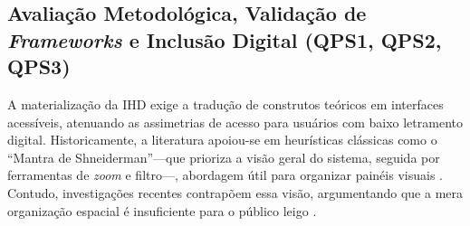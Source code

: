 \documentclass[12pt]{article}
\newcommand{\hlcite}[1]{\colorbox{yellow}{\cite{#1}}} %
\begin{document}
{{    %


    \subsection{Avaliação Metodológica, Validação de \textit{Frameworks} e Inclusão Digital (QPS1, QPS2, QPS3)}

    A materialização da IHD exige a tradução de construtos teóricos em interfaces acessíveis, atenuando as assimetrias de acesso para usuários com baixo letramento digital. Historicamente, a literatura apoiou-se em heurísticas clássicas como o ``Mantra de Shneiderman''---que prioriza a visão geral do sistema, seguida por ferramentas de \textit{zoom} e filtro---, abordagem útil para organizar painéis visuais \hlcite{Victorelli2020Human}. Contudo, investigações recentes contrapõem essa visão, argumentando que a mera organização espacial é insuficiente para o público leigo \cite{Yuan20243615, Lindley2020}.

}}
\end{document}
